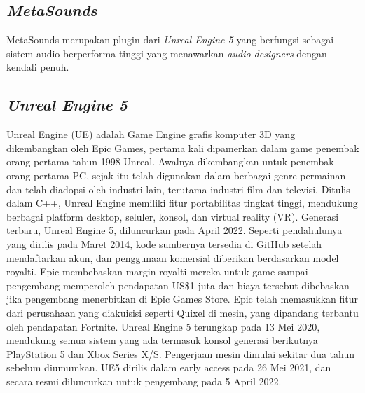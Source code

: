 \subsection{\emph{MetaSounds}}
MetaSounds merupakan plugin dari \emph{Unreal Engine 5} yang berfungsi sebagai sistem audio
berperforma tinggi yang menawarkan \emph{audio designers} dengan kendali penuh.

\subsection{\emph{Unreal Engine 5}}

Unreal Engine (UE) adalah Game Engine grafis komputer 3D yang dikembangkan oleh Epic Games, pertama kali dipamerkan dalam game penembak orang pertama tahun 1998 Unreal.
Awalnya dikembangkan untuk penembak orang pertama PC, sejak itu telah digunakan dalam berbagai genre permainan dan telah diadopsi oleh industri lain, terutama industri film dan televisi. Ditulis dalam C++,
Unreal Engine memiliki fitur portabilitas tingkat tinggi, mendukung berbagai platform desktop, seluler, konsol, dan virtual reality (VR).
Generasi terbaru, Unreal Engine 5, diluncurkan pada April 2022. Seperti pendahulunya yang dirilis pada Maret 2014, kode sumbernya tersedia di GitHub setelah mendaftarkan akun, dan penggunaan komersial diberikan
berdasarkan model royalti. Epic membebaskan margin royalti mereka untuk game sampai pengembang memperoleh pendapatan US\$1 juta dan biaya tersebut dibebaskan jika pengembang menerbitkan di Epic Games Store. Epic telah memasukkan fitur dari perusahaan yang diakuisisi seperti Quixel di mesin, yang dipandang terbantu oleh pendapatan Fortnite.
Unreal Engine 5 terungkap pada 13 Mei 2020, mendukung semua sistem yang ada termasuk konsol generasi berikutnya PlayStation 5 dan Xbox Series X/S.\parencite{StattEpicAnnounce} Pengerjaan mesin dimulai sekitar dua
tahun sebelum diumumkan.\parencite{DeanTakahashi} UE5 dirilis dalam early access pada 26 Mei 2021,\parencite{EddieMakuch} dan secara resmi diluncurkan untuk pengembang pada 5 April 2022.\parencite{UE5Launch}

